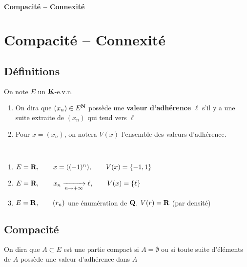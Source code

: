 \ifsolo
    ~

    \vspace{1cm}

    \begin{center}
        \textbf{\LARGE Compacité -- Connexité} \\[1em]
    \end{center}
    \tableofcontents
\else
    \chapter{Compacité -- Connexité}

    \minitoc
\fi
\thispagestyle{empty}

\section{Définitions}

\begin{dfn}
On note $E$ un  $\mathbf K$-e.v.n. \begin{enumerate}
    \item On dira que $(x_n)\in E^{\mathbf N}$ possède une \textbf{valeur d'adhérence} $\ell$ s'il y a une suite extraite de $ (x_n)$ qui tend vers  $\ell$
    \item Pour  $x=(x_n)$, on notera  $V(x)$ l'ensemble des valeurs d'adhérence.
\end{enumerate}
\end{dfn}

\begin{ex}~
\begin{enumerate}
    \item $E=\mathbf R,\qquad x=((-1)^n),\qquad V(x)=\{-1,1\} $
    \item $E=\mathbf R,\qquad x_n \xrightarrow[n\to+\infty]{}\ell,\qquad  V(x)=\{\ell\} $
    \item $E=\mathbf R,\qquad (r_n)$ une énumération de $\mathbf Q$. $V(r)=\mathbf R$ (par densité)
\end{enumerate}
\end{ex}

\section{Compacité}

\begin{dfn}
On dira que $A\subset E$ est une partie compact si  $A=\emptyset$ ou si toute suite d'éléments de  $A$ possède une valeur d'adhérence dans  $A$
\end{dfn}

